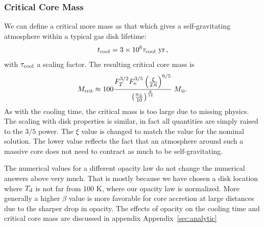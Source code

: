 \documentclass[apj]{emulateapj}
\newcommand{\App}[1]{Appendix~\ref{#1}}
\newcommand{\di}{_{\rm o}}
\newcommand{\cb}{_{\rm RCB}}
\newcommand{\au}{a_\oplus}
\begin{document}
\subsubsection{Critical Core Mass}\label{sec:critmass}


We can define a critical more mass as that which gives a self-gravitating atmosphere within a typical gas disk lifetime:
\begin{equation}
t_{\rm cool} = 3 \times 10^6 \tau_{\rm cool} ~{\rm yr} \, ,
\end{equation} 
with $\tau_{\rm cool}$ a scaling factor.  The resulting critical core mass is
\begin{equation}\label{eq:Mcrit}
M_{\rm crit} \approx 100 {F_T^{3/2} F_\kappa^{3/5}   \left(\xi \over 2.6 \right)^{6/5} \over \left(\au \over 10\right)^{9 \over 14}} \; M_\oplus.
\end{equation} 
As with the cooling time, the critical mass is too large due to missing physics.  The scaling with disk properties is similar, in fact all quantities are simply raised to the $3/5$ power.  The $\xi$ value is changed to match the value for the nominal solution.  The lower value reflects the fact that an atmosphere around such a massive core does not need to contract as much to be self-gravitating.  

The numerical values for a different opacity law do not change the numerical answers above very much.  That is mostly because we have chosen a disk location where $T_{\rm d}$ is not far from 100 K, where our opacity law is normalized.  More generally a higher $\beta$ value is more favorable for core accretion at large distances due to the sharper drop in opacity. The effects of opacity on the cooling time and critical core mass are discussed in appendix \App{sec:analytic}


%
\end{document}
